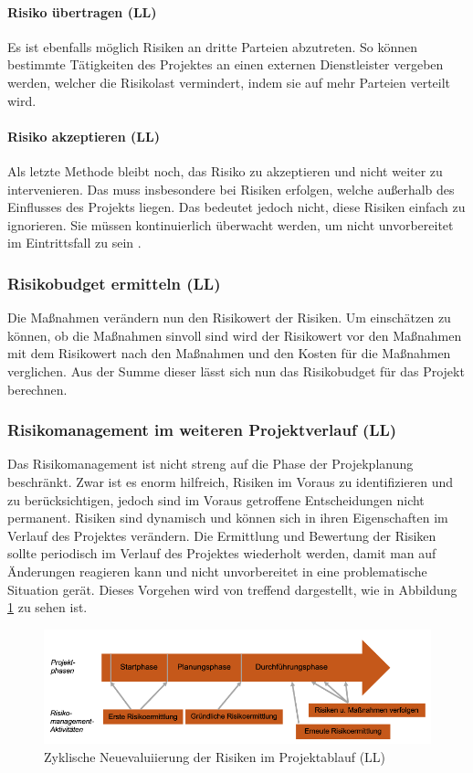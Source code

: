 \documentclass[ThesisDJ.tex]{subfiles}
\begin{document}
\paragraph{Risiko übertragen (LL)}
Es ist ebenfalls möglich Risiken an dritte Parteien abzutreten. So können bestimmte Tätigkeiten des Projektes an einen externen Dienstleister vergeben werden, welcher die Risikolast vermindert, indem sie auf mehr Parteien verteilt wird. 

\paragraph{Risiko akzeptieren (LL)}
Als letzte Methode bleibt noch, das Risiko zu akzeptieren und nicht weiter zu intervenieren. Das muss insbesondere bei Risiken erfolgen, welche außerhalb des Einflusses des Projekts liegen. Das bedeutet jedoch nicht, diese Risiken einfach zu ignorieren. Sie müssen kontinuierlich überwacht werden, um nicht unvorbereitet im Eintrittsfall zu sein \cite{cicek2022risikomanagement}.

\subsubsection{Risikobudget ermitteln (LL)}
Die Maßnahmen verändern nun den Risikowert der Risiken. Um einschätzen zu können, ob die Maßnahmen sinvoll sind wird der Risikowert vor den Maßnahmen mit dem Risikowert nach den Maßnahmen und den Kosten für die Maßnahmen verglichen. Aus der Summe dieser lässt sich nun das Risikobudget für das Projekt berechnen.

\subsubsection{Risikomanagement im weiteren Projektverlauf (LL)}
Das Risikomanagement ist nicht streng auf die Phase der Projekplanung beschränkt. Zwar ist es enorm hilfreich, Risiken im Voraus zu identifizieren und zu berücksichtigen, jedoch sind im Voraus getroffene Entscheidungen nicht permanent. Risiken sind dynamisch und können sich in ihren Eigenschaften im Verlauf des Projektes verändern. Die Ermittlung und Bewertung der Risiken sollte periodisch im Verlauf des Projektes wiederholt werden, damit man auf Änderungen reagieren kann und nicht unvorbereitet in eine problematische Situation gerät. Dieses Vorgehen wird von \cite[S.~27]{cicek2022risikomanagement} treffend dargestellt, wie in Abbildung \ref{fig:riskcycle} zu sehen ist.

\begin{figure}
    \centering
    \includegraphics[width=\linewidth]{riskcycle.png}
    \caption{Zyklische Neuevaluiierung der Risiken im Projektablauf (LL)}
    \label{fig:riskcycle}
\end{figure}
\end{document}
